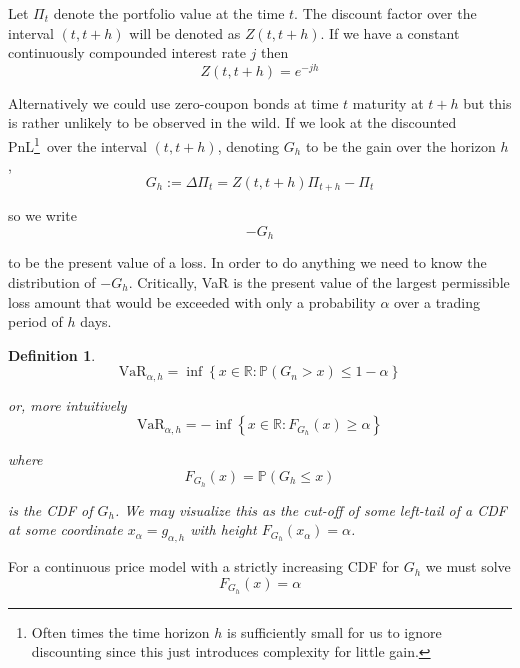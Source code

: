 \documentclass[12pt]{article}
\newtheorem{definition}{Definition}
\newlength\tindent
\renewcommand{\indent}{\hspace*{\tindent}}
\newcommand{\R}{\mathbb R}
\renewcommand{\P}{\mathbb P}
\begin{document}
\indent Let $\Pi_t$ denote the portfolio value at the time $t$. The discount factor over the interval $(t, t + h)$ will be denoted as $Z(t, t + h)$. If we have a constant continuously compounded interest rate $j$ then 
\begin{equation*}
	Z(t, t + h) = e^{-jh}
\end{equation*}

\indent Alternatively we could use zero-coupon bonds at time $t$ maturity at $t + h$ but this is rather unlikely to be observed in the wild. If we look at the discounted PnL\footnote{Often times the time horizon $h$ is sufficiently small for us to ignore discounting since this just introduces complexity for little gain.}~over the interval $(t, t + h)$, denoting $G_h$ to be the gain over the horizon $h$,
\begin{equation*}
	G_h := \Delta\Pi_t = Z(t, t + h)\Pi_{t + h} - \Pi_t
\end{equation*}

so we write
\begin{equation*}
	-G_h
\end{equation*}

to be the present value of a loss. In order to do anything we need to know the distribution of $-G_h$. Critically, VaR is the present value of the largest permissible loss amount that would be exceeded with only a probability $\alpha$ over a trading period of $h$ days.

\begin{definition}
\begin{equation*}
	\text{VaR}_{\alpha, h} = \inf \left\{ x \in \R: \P(G_n > x) \leq 1 - \alpha \right\}
\end{equation*}

or, more intuitively
\begin{equation*}
	\text{VaR}_{\alpha, h} = -\inf \left\{ x \in \R: F_{G_h}(x) \geq \alpha \right\}
\end{equation*}

where
\begin{equation*}
	F_{G_h}(x) = \P(G_h \leq x)
\end{equation*}

is the CDF of $G_h$. We may visualize this as the cut-off of some left-tail of a CDF at some coordinate $x_\alpha = g_{\alpha, h}$ with height $F_{G_h}(x_\alpha) = \alpha$.
\end{definition}

For a continuous price model with a strictly increasing CDF for $G_h$ we must solve
\begin{equation*}
	F_{G_h}(x) = \alpha
\end{equation*}
\end{document}
